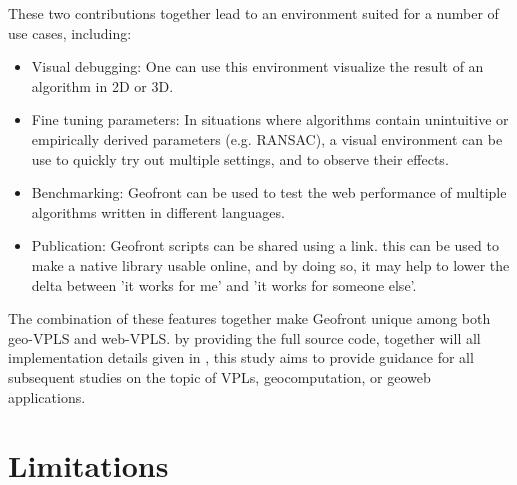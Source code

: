 These two contributions together lead to an environment suited for a number of use cases, including: 
\begin{itemize}
  \item Visual debugging: One can use this environment visualize the result of an algorithm in 2D or 3D.
  \item Fine tuning parameters: In situations where algorithms contain unintuitive or empirically derived parameters (e.g. RANSAC), a visual environment can be use to quickly try out multiple settings, and to observe their effects.
  \item Benchmarking: Geofront can be used to test the web performance of multiple algorithms written in different languages. 
  \item Publication: Geofront scripts can be shared using a link. 
    this can be used to make a native library usable online, and by doing so, it may help to lower the delta between 'it works for me' and 'it works for someone else'.
\end{itemize} 
The combination of these features together make Geofront unique among both \\ geo-VPLS and web-VPLS. 
by providing the full source code, together will all implementation details given in , this study aims to provide guidance for all subsequent studies on the topic of VPLs, geocomputation, or geoweb applications.



\section{Limitations}
\label{sec:limitations}

